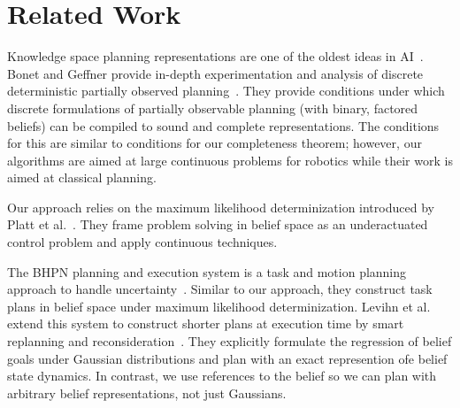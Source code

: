 \section{Related Work}

Knowledge space planning representations are one of the oldest ideas
in AI~\cite{mccarthy1968some}. Bonet and Geffner provide in-depth
experimentation and analysis of discrete deterministic partially
observed planning~\cite{bonet2011planning}.  They provide conditions
under which discrete formulations of partially observable planning
(with binary, factored beliefs) can be compiled to sound and complete
representations. The conditions for this are similar to conditions for
our completeness theorem; however, our algorithms are aimed at large
continuous problems for robotics while their work is aimed at
classical planning.

Our approach relies on the maximum likelihood determinization
introduced by Platt et al.~\cite{platt2010belief}. They frame problem
solving in belief space as an underactuated control problem and apply
continuous techniques. 

The BHPN planning and execution system is a task and motion planning
approach to handle uncertainty~\cite{kaelbling2013integrated}. Similar
to our approach, they construct task plans in belief space under
maximum likelihood determinization. Levihn et al. extend this system
to construct shorter plans at execution time by smart replanning and
reconsideration~\cite{levihn2013foresight}. They explicitly formulate
the regression of belief goals under Gaussian distributions and plan
with an exact represention ofe belief state dynamics. In contrast, we
use references to the belief so we can plan with arbitrary belief
representations, not just Gaussians.

